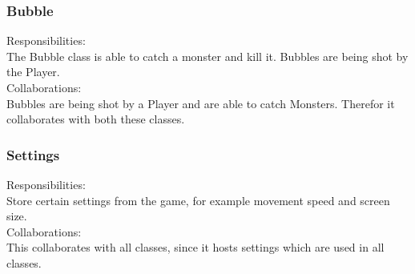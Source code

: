 \subsubsection{Bubble}
Responsibilities: \\
The Bubble class is able to catch a monster and kill it. Bubbles are being shot by the Player. \\
Collaborations: \\
Bubbles are being shot by a Player and are able to catch Monsters. Therefor it collaborates with both these classes. 

\subsubsection{Settings}
Responsibilities: \\
Store certain settings from the game, for example movement speed and screen size. \\
Collaborations: \\
This collaborates with all classes, since it hosts settings which are used in all classes. 
